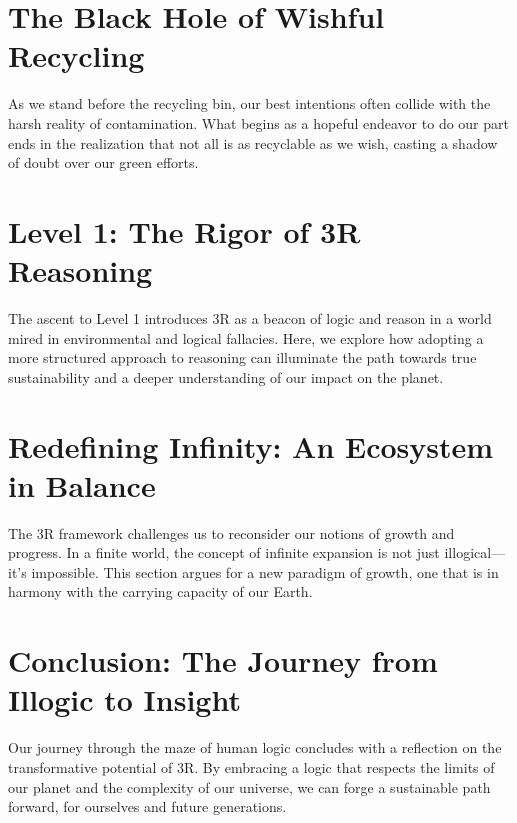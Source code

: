 \documentclass[12pt]{article}
\begin{document}
\section*{The Black Hole of Wishful Recycling}

As we stand before the recycling bin, our best intentions often collide with the harsh reality of contamination. What begins as a hopeful endeavor to do our part ends in the realization that not all is as recyclable as we wish, casting a shadow of doubt over our green efforts.

\section*{Level 1: The Rigor of 3R Reasoning}

The ascent to Level 1 introduces 3R as a beacon of logic and reason in a world mired in environmental and logical fallacies. Here, we explore how adopting a more structured approach to reasoning can illuminate the path towards true sustainability and a deeper understanding of our impact on the planet.

\section*{Redefining Infinity: An Ecosystem in Balance}

The 3R framework challenges us to reconsider our notions of growth and progress. In a finite world, the concept of infinite expansion is not just illogical—it's impossible. This section argues for a new paradigm of growth, one that is in harmony with the carrying capacity of our Earth.

\section*{Conclusion: The Journey from Illogic to Insight}

Our journey through the maze of human logic concludes with a reflection on the transformative potential of 3R. By embracing a logic that respects the limits of our planet and the complexity of our universe, we can forge a sustainable path forward, for ourselves and future generations.
\end{document}
